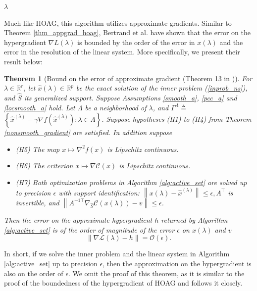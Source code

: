 \documentclass[11pt, twoside]{report}
\newtheorem{theorem}{Theorem}[section]
\begin{document}
\begin{algorithm}[H]

 \Return $\lambda$
 \caption{Gradient Descent with Approximate Gradient}
\end{algorithm}
Much like HOAG, this algorithm utilizes approximate gradients. Similar to Theorem \ref{thm_appgrad_hoag}, Bertrand et al. have shown that the error on the hypergradient $\nabla L(\lambda)$ is bounded by the order of the error in $x(\lambda)$ and the error in the resolution of the linear system. More specifically, we present their result below:
\begin{theorem}[Bound on the error of approximate gradient (Theorem 13 in \cite{bertrand2022implicit})]
For $\lambda \in \mathbb{R}^r$, let $\hat{x}(\lambda) \in \mathbb{R}^p$ be the exact solution of the inner problem (\ref{inprob_ns}), and $\hat{S}$ its generalized support. Suppose Assumptions \ref{smooth_a}, \ref{pcc_a} and \ref{locsmooth_a} hold. Let $\Lambda$ be a neighborhood of $\lambda$, and $\Gamma^{\Lambda} \triangleq$ $\left\{\hat{x}^{(\lambda)}-\gamma \nabla f\left(\hat{x}^{(\lambda)}\right): \lambda \in \Lambda\right\}$. Suppose hypotheses (H1) to (H4) from Theorem \ref{nonsmooth_gradient} are satisfied. In addition suppose
\begin{itemize}
    \item (H5) The map $x \mapsto \nabla^2 f(x)$ is Lipschitz continuous.
    \item (H6) The criterion $x \mapsto \nabla \mathcal{C}(x)$ is Lipschitz continuous.
    \item (H7) Both optimization problems in Algorithm \ref{alg:active_set} are solved up to precision $\epsilon$ with support identification: $\left\|x(\lambda)-\hat{x}^{(\lambda)}\right\| \leq \epsilon, A^{\top}$ is invertible, and $\left\|A^{-1 \top} \nabla_{\hat{S}} \mathcal{C}\left(x(\lambda)\right)-v\right\| \leq \epsilon$.
\end{itemize}
Then the error on the approximate hypergradient $h$ returned by Algorithm \ref{alg:active_set} is of the order of magnitude of the error $\epsilon$ on $x(\lambda)$ and $v$
$$
\|\nabla \mathcal{L}(\lambda)-h\|=\mathcal{O}(\epsilon).
$$
\end{theorem}
In short, if we solve the inner problem and the linear system in Algorithm \ref{alg:active_set} up to precision $\epsilon$, then the approximation on the hypergradient is also on the order of $\epsilon$. We omit the proof of this theorem, as it is similar to the proof of the boundedness of the hypergradient of HOAG and follows it closely.
\end{document}
